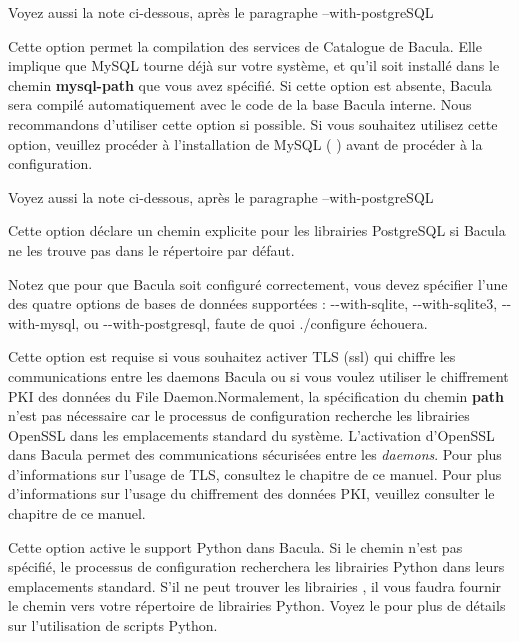 {{{\begin{description}
{{Voyez aussi la note ci-dessous, apr\`es le paragraphe --with-postgreSQL

\item [{-}{-}with-mysql=\lt{}mysql-path\gt{}]
   Cette option permet la compilation des services de Catalogue de Bacula. Elle
implique que MySQL tourne d\'ej\`a  sur votre syst\`eme, et qu'il soit
install\'e dans le chemin {\bf mysql-path} que vous avez sp\'ecifi\'e.  Si
cette option est absente, Bacula sera compil\'e automatiquement avec le code
de la base Bacula interne.  Nous recommandons d'utiliser cette option si
possible. Si vous souhaitez utilisez cette option,  veuillez proc\'eder \`a
l'installation de MySQL (
)  avant de
proc\'eder \`a la configuration.  

Voyez aussi la note ci-dessous, apr\`es le paragraphe --with-postgreSQL

\item [{-}{-}with-postgresql=\lt{}postgresql-path\gt{}]
   Cette option d\'eclare un chemin explicite pour les  librairies PostgreSQL si
Bacula ne les trouve pas dans le r\'epertoire par d\'efaut.  

Notez que pour que Bacula soit configur\'e correctement, vous devez sp\'ecifier l'une des 
quatre options de bases de donn\'ees support\'ees : {-}{-}with-sqlite, {-}{-}with-sqlite3, 
{-}{-}with-mysql, ou {-}{-}with-postgresql, faute de quoi ./configure \'echouera.

\item [ {-}{-}with-openssl=\lt{}path\gt{}]
   Cette option est requise si vous souhaitez activer TLS (ssl) qui chiffre les 
   communications entre les daemons Bacula ou si vous voulez utiliser le chiffrement 
   PKI des données du File Daemon.Normalement, la sp\'ecification du chemin {\bf path} 
   n'est pas n\'ecessaire car le processus de 
   configuration recherche les librairies OpenSSL dans les emplacements standard du 
   syst\`eme. L'activation d'OpenSSL dans Bacula permet des communications s\'ecuris\'ees 
   entre les {\it daemons}. Pour plus d'informations sur l'usage de TLS, consultez le 
   chapitre   de ce manuel. Pour plus d'informations 
   sur l'usage du chiffrement des données PKI, veuillez consulter le chapitre 
    de ce manuel.

\item [ {-}{-}with-python=\lt{}path\gt{}]
   Cette option active le support Python dans Bacula. Si le chemin n'est pas 
   sp\'ecifi\'e, le processus de configuration recherchera les librairies Python 
   dans leurs emplacements standard. S'il ne peut trouver les librairies , il vous faudra 
   fournir le chemin vers votre r\'epertoire de librairies Python. Voyez le 
    pour plus de d\'etails sur l'utilisation de 
   scripts Python.
   
}}
\end{description}}}}
